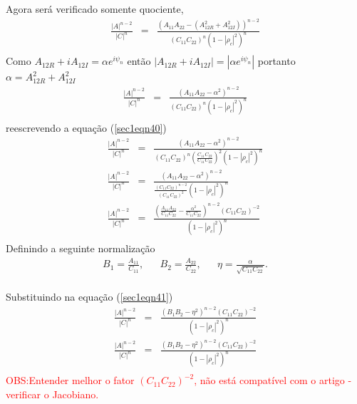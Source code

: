 \documentclass[12pt,a4paper]{article}
\begin{document}
Agora será verificado somente quociente,
\begin{equation}\label{sec1eqn39}
\begin{array}{ccc}
	\frac{\left|A\right|^{n-2}}{\left|C\right|^{n}}&=&\frac{(A_{11}A_{22}-(A_{12R}^2+A_{12I}^2))^{n-2}}{(C_{11}C_{22})^{n}(1-\left|\rho_c\right|^2)^{n}}\\
\end{array}
\end{equation}
Como  $A_{12R}+iA_{12I}=\alpha e^{i\psi_n}$ então $\left|A_{12R}+iA_{12I}\right|=|\alpha e^{i\psi_n}|$ portanto $\alpha=A_{12R}^2+A_{12I}^2$ 
\begin{equation}\label{sec1eqn40}
\begin{array}{ccc}
	\frac{\left|A\right|^{n-2}}{\left|C\right|^{n}}&=&\frac{(A_{11}A_{22}-\alpha^2)^{n-2}}{(C_{11}C_{22})^{n}(1-\left|\rho_c\right|^2)^{n}}\\
\end{array}
\end{equation}
reescrevendo a equação (\ref{sec1eqn40})
\begin{equation}\label{sec1eqn41}
\begin{array}{ccc}
	\frac{\left|A\right|^{n-2}}{\left|C\right|^{n}}&=&\frac{(A_{11}A_{22}-\alpha^2)^{n-2}}{(C_{11}C_{22})^{n}\left(\frac{C_{11}C_{22}}{C_{11}C_{22}}\right)^2(1-\left|\rho_c\right|^2)^{n}}\\
	\frac{\left|A\right|^{n-2}}{\left|C\right|^{n}}&=&\frac{(A_{11}A_{22}-\alpha^2)^{n-2}}{\frac{(C_{11}C_{22})^{n-2}}{\left(C_{11}C_{22}\right)^2}(1-\left|\rho_c\right|^2)^{n}}\\
	\frac{\left|A\right|^{n-2}}{\left|C\right|^{n}}&=&\frac{\left(\frac{A_{11}A_{22}}{C_{11}C_{22}}-\frac{\alpha^2}{C_{11}C_{22}}\right)^{n-2}(C_{11}C_{22})^{-2}}{(1-\left|\rho_c\right|^2)^{n}}\\
\end{array}
\end{equation}
Definindo a seguinte normalização 
\begin{equation}\label{sec1eqn42}
\begin{array}{ccccc}
	B_1=\frac{A_{11}}{C_{11}},&&B_2=\frac{A_{22}}{C_{22}},&&\eta=\frac{\alpha}{\sqrt{C_{11}C_{22}}}.\\
\end{array}
\end{equation}

Substituindo na equação (\ref{sec1eqn41})
\begin{equation}\label{sec1eqn43}
\begin{array}{ccc}
	\frac{\left|A\right|^{n-2}}{\left|C\right|^{n}}&=&\frac{\left(B_1B_2-\eta^2\right)^{n-2}(C_{11}C_{22})^{-2}}{(1-\left|\rho_c\right|^2)^{n}}\\
	\frac{\left|A\right|^{n-2}}{\left|C\right|^{n}}&=&\frac{\left(B_1B_2-\eta^2\right)^{n-2}(C_{11}C_{22})^{-2}}{(1-\left|\rho_c\right|^2)^{n}}\\
\end{array}
\end{equation}
\textcolor{red}{OBS:Entender melhor o fator $(C_{11}C_{22})^{-2}$, não está compatível com o artigo \cite{lee94}- verificar o Jacobiano.}
\end{document}
